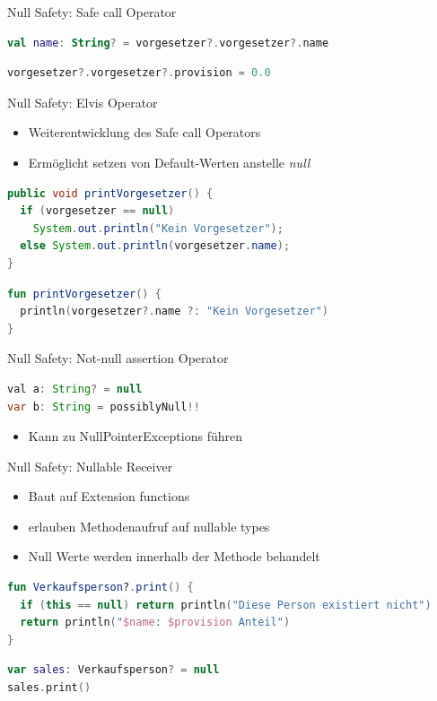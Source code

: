 \documentclass{beamer}
\begin{document}
\begin{frame}[fragile]{Null Safety: Safe call Operator}
  \begin{lstlisting}[language=Kotlin, title=Verkettung des Operators]
val name: String? = vorgesetzer?.vorgesetzer?.name   
  \end{lstlisting}
  \pause
  \begin{lstlisting}[language=Kotlin, title=Zuweisungen mit dem Operator]
vorgesetzer?.vorgesetzer?.provision = 0.0
  \end{lstlisting}
\end{frame}

\begin{frame}[fragile]{Null Safety: Elvis Operator}
  \begin{itemize}[<+->]
    \item Weiterentwicklung des Safe call Operators
    \item Ermöglicht setzen von Default-Werten anstelle \textit{null}
  \end{itemize}
  \pause[\thebeamerpauses]
  \begin{lstlisting}[language=Java]
public void printVorgesetzer() {
  if (vorgesetzer == null)
    System.out.println("Kein Vorgesetzer");
  else System.out.println(vorgesetzer.name);
}
  \end{lstlisting}
  \pause
  \begin{lstlisting}[language=Kotlin]
fun printVorgesetzer() {
  println(vorgesetzer?.name ?: "Kein Vorgesetzer")
}
  \end{lstlisting}
\end{frame}

\begin{frame}[fragile]{Null Safety: Not-null assertion Operator}
  \begin{lstlisting}[language=Java]
val a: String? = null
var b: String = possiblyNull!!
  \end{lstlisting}
  \pause
  \begin{itemize}[<+->]
    \item Kann zu NullPointerExceptions führen
  \end{itemize}
\end{frame}

\begin{frame}[fragile]{Null Safety: Nullable Receiver}
  \begin{itemize}[<+->]
    \item Baut auf Extension functions
    \item erlauben Methodenaufruf auf nullable types
    \item Null Werte werden innerhalb der Methode behandelt
  \end{itemize}
  \pause \vspace{1cm}
  \begin{lstlisting}[language=Kotlin]
fun Verkaufsperson?.print() {
  if (this == null) return println("Diese Person existiert nicht")
  return println("$name: $provision Anteil")
}
  \end{lstlisting}
  \pause
  \begin{lstlisting}[language=Kotlin]
var sales: Verkaufsperson? = null
sales.print()
  \end{lstlisting}
\end{frame}
\end{document}
